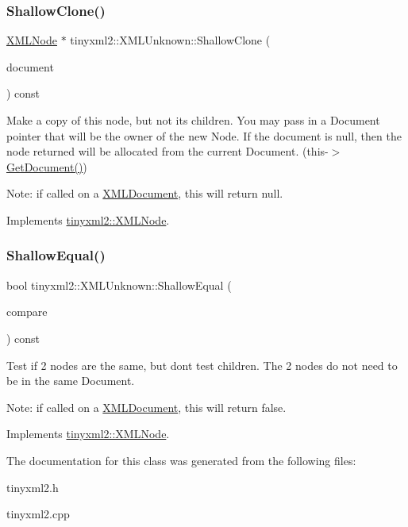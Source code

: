 \subsubsection{\texorpdfstring{ShallowClone()}{ShallowClone()}}
{\footnotesize\ttfamily \mbox{\hyperlink{classtinyxml2_1_1_x_m_l_node}{X\+M\+L\+Node}} $\ast$ tinyxml2\+::\+X\+M\+L\+Unknown\+::\+Shallow\+Clone (\begin{DoxyParamCaption}\item[{\mbox{\hyperlink{classtinyxml2_1_1_x_m_l_document}{X\+M\+L\+Document}} $\ast$}]{document }\end{DoxyParamCaption}) const\hspace{0.3cm}{\ttfamily [virtual]}}

Make a copy of this node, but not its children. You may pass in a Document pointer that will be the owner of the new Node. If the \textquotesingle{}document\textquotesingle{} is null, then the node returned will be allocated from the current Document. (this-\/$>$\mbox{\hyperlink{classtinyxml2_1_1_x_m_l_node_af343d1ef0b45c0020e62d784d7e67a68}{Get\+Document()}})

Note\+: if called on a \mbox{\hyperlink{classtinyxml2_1_1_x_m_l_document}{X\+M\+L\+Document}}, this will return null. 

Implements \mbox{\hyperlink{classtinyxml2_1_1_x_m_l_node_a8402cbd3129d20e9e6024bbcc0531283}{tinyxml2\+::\+X\+M\+L\+Node}}.

\mbox{\label{classtinyxml2_1_1_x_m_l_unknown_ac46767cd721d666e690a6231dfb618d1}} 
\subsubsection{\texorpdfstring{ShallowEqual()}{ShallowEqual()}}
{\footnotesize\ttfamily bool tinyxml2\+::\+X\+M\+L\+Unknown\+::\+Shallow\+Equal (\begin{DoxyParamCaption}\item[{const \mbox{\hyperlink{classtinyxml2_1_1_x_m_l_node}{X\+M\+L\+Node}} $\ast$}]{compare }\end{DoxyParamCaption}) const\hspace{0.3cm}{\ttfamily [virtual]}}

Test if 2 nodes are the same, but don\textquotesingle{}t test children. The 2 nodes do not need to be in the same Document.

Note\+: if called on a \mbox{\hyperlink{classtinyxml2_1_1_x_m_l_document}{X\+M\+L\+Document}}, this will return false. 

Implements \mbox{\hyperlink{classtinyxml2_1_1_x_m_l_node_a7ce18b751c3ea09eac292dca264f9226}{tinyxml2\+::\+X\+M\+L\+Node}}.



The documentation for this class was generated from the following files\+:\begin{DoxyCompactItemize}
\item 
tinyxml2.\+h\item 
tinyxml2.\+cpp\end{DoxyCompactItemize}
